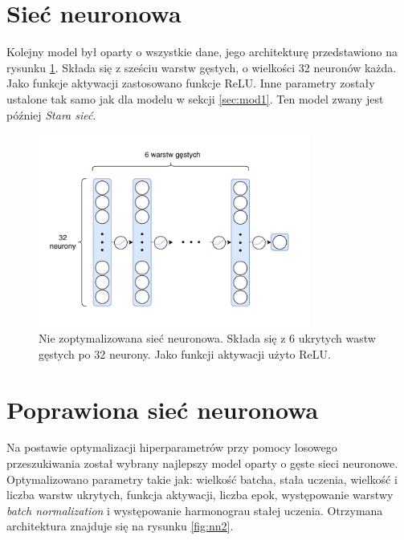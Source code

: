\documentclass{pracalicmgr}
\begin{document}
	\section{Sieć neuronowa}
	\label{sec:mod2}
	Kolejny model był oparty o wszystkie dane, jego architekturę przedstawiono na rysunku \ref{fig:nn1}. Składa się z sześciu warstw gęstych, o wielkości 32 neuronów każda. Jako funkcje aktywacji zastosowano funkcje ReLU. Inne parametry zostały ustalone tak samo jak dla modelu w sekcji \ref{sec:mod1}. Ten model zwany jest później \textit{Stara sieć}.
	\begin{figure}
	\centering
	\includegraphics[width=0.8\textwidth]{neural_net.pdf}
	\caption{Nie zoptymalizowana sieć neuronowa. Składa się z 6 ukrytych wastw gęstych po 32 neurony. Jako funkcji aktywacji użyto ReLU.}
	\label{fig:nn1}
	\end{figure}
	
	\section{Poprawiona sieć neuronowa}
	Na postawie optymalizacji hiperparametrów przy pomocy losowego przeszukiwania został wybrany najlepszy model oparty o gęste sieci neuronowe. Optymalizowano parametry takie jak: wielkość batcha, stała uczenia, wielkość i liczba warstw ukrytych, funkcja aktywacji, liczba epok, występowanie warstwy \textit{batch normalization} i występowanie harmonograu stałej uczenia. Otrzymana architektura znajduje się na rysunku \ref{fig:nn2}. 
	
\end{document}
